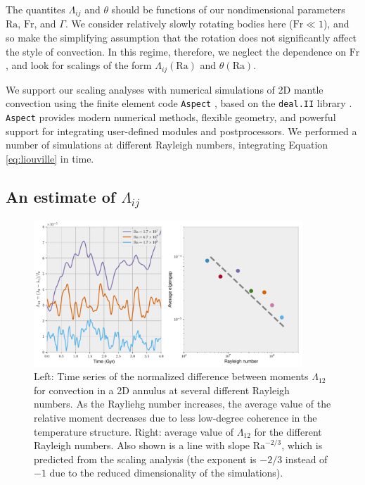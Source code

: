 \documentclass[extra,mreferee]{gji}
\begin{document}
The quantites $\Lambda_{ij}$ and $\theta$ should be functions of our nondimensional parameters $\mathrm{Ra}$, $\mathrm{Fr}$, and $\Gamma$.  
We consider relatively slowly rotating bodies here ($\mathrm{Fr} \ll 1$), and so make the simplifying assumption that the rotation does not significantly affect the style of convection.  
In this regime, therefore, we neglect the dependence on $\mathrm{Fr}$, and look for scalings of the form $\Lambda_{ij}(\mathrm{Ra})$ and $\theta(\mathrm{Ra})$.

We support our scaling analyses with numerical simulations of 2D mantle convection using the finite element code \texttt{Aspect} \citep{kronbichler2012high}, based on the \texttt{deal.II} library \citep{dealII81}.  
\texttt{Aspect} provides modern numerical methods, flexible geometry, and powerful support for integrating user-defined modules and postprocessors.
We performed a number of simulations at different Rayleigh numbers, integrating Equation \ref{eq:liouville} in time.

\subsection{An estimate of $\Lambda_{ij}$}

\begin{figure}
\centering
\label{misfit}
\includegraphics[width=0.9\textwidth]{figures/eigengap.pdf}
\caption{ Left: Time series of the normalized difference between moments $\Lambda_{12}$ for convection in a 2D annulus at several different Rayleigh numbers.  As the Rayliehg number increases, the average value of the relative moment decreases due to less low-degree coherence in the temperature structure.  Right:  average value of $\Lambda_{12}$ for the different Rayleigh numbers.  Also shown is a line with slope $\mathrm{Ra}^{-2/3}$, which is predicted from the scaling analysis (the exponent is $-2/3$ instead of $-1$ due to the reduced dimensionality of the simulations).}
\end{figure}
\end{document}
